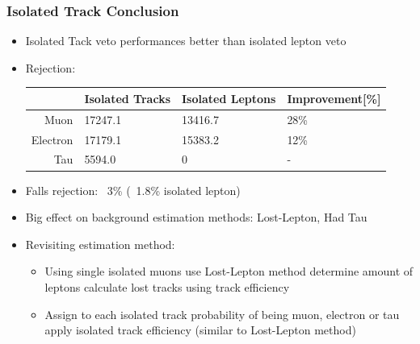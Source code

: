 \documentclass{beamer}
\begin{document}
\begin{frame}
\frametitle{Isolated Track Conclusion}
\begin{itemize}
 \item Isolated Tack veto performances better than isolated lepton veto
 \item Rejection:
  \begin{tabular}{|r|l|l|l|}
        \hline
                     & Isolated Tracks    & Isolated Leptons         & Improvement[\%]     \\  \hline
        Muon         &17247.1                            & 13416.7            &28\%              \\ 
        Electron     &17179.1                           & 15383.2          &12\%            \\
        Tau          &5594.0                          & 0          &-           \\ 
        \hline
    \end{tabular}
 \item Falls rejection: ~3\% (~1.8\% isolated lepton)
 \item Big effect on background estimation methods: Lost-Lepton, Had Tau
 \item Revisiting estimation method:
 \begin{itemize}
  \item Using single isolated muons use Lost-Lepton method determine amount of leptons calculate lost tracks using track efficiency
  \item Assign to each isolated track probability of being muon, electron or tau apply isolated track efficiency (similar to Lost-Lepton method)
 \end{itemize}


\end{itemize}

\end{frame}
\end{document}
